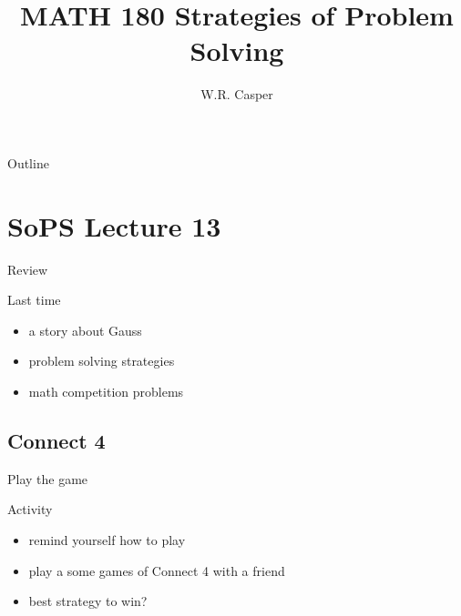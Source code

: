 \documentclass{beamer}
\title{MATH 180 Strategies of Problem Solving}
\subtitle
{} %
\author[W.R. Casper] %
{W.R. Casper}
\institute[California State University Fullerton] %
{
  Department of Mathematics\\
  California State University Fullerton}
\begin{document}
\begin{frame}
  \titlepage
\end{frame}

\begin{frame}{Outline}
  \tableofcontents
\end{frame}



\section{SoPS Lecture 13}

\begin{frame}{Review}
  \begin{block}{Last time}
    \begin{itemize}
\pause
      \item a story about Gauss
\pause
      \item problem solving strategies
\pause
      \item math competition problems
    \end{itemize}
  \end{block}
\end{frame}

\subsection{Connect 4}

\begin{frame}{Play the game}
  \begin{block}{Activity}
    \begin{itemize}
\pause
      \item remind yourself how to play
\pause
      \item play a some games of Connect 4 with a friend
\pause
      \item best strategy to win?
    \end{itemize}
  \end{block}
\end{frame}
\end{document}

